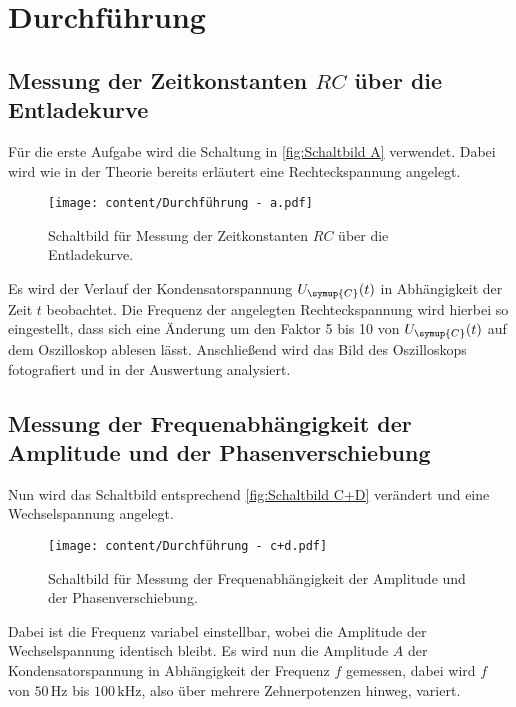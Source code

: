 \section{Durchführung}
\label{sec:Durchführung}

\subsection{Messung der Zeitkonstanten $RC$ über die Entladekurve}

Für die erste Aufgabe wird die Schaltung in \autoref{fig:Schaltbild A} verwendet.
Dabei wird wie in der Theorie bereits erläutert eine Rechteckspannung angelegt.

\begin{figure}
    \centering
    \texttt{[image: content/Durchführung - a.pdf]}
    \caption{Schaltbild für Messung der Zeitkonstanten $RC$ über die Entladekurve. \cite{v353}}
    \label{fig:Schaltbild A}
\end{figure}


Es wird der Verlauf der Kondensatorspannung $U_{\symup{C}}(t)$ in Abhängigkeit der Zeit $t$ beobachtet.
Die Frequenz der angelegten Rechteckspannung wird hierbei so eingestellt,
dass sich eine Änderung um den Faktor 5 bis 10 von $U_{\symup{C}}(t)$ auf dem Oszilloskop ablesen lässt.
Anschließend wird das Bild des Oszilloskops fotografiert und in der Auswertung analysiert.

\subsection{Messung der Frequenabhängigkeit der Amplitude und der Phasenverschiebung}

Nun wird das Schaltbild entsprechend  \autoref{fig:Schaltbild C+D} verändert und eine Wechselspannung angelegt.

\begin{figure} [H]
    \centering
    \texttt{[image: content/Durchführung - c+d.pdf]}
    \caption{Schaltbild für Messung der Frequenabhängigkeit der Amplitude und der Phasenverschiebung. \cite{v353}}
    \label{fig:Schaltbild C+D}
\end{figure}

Dabei ist die Frequenz variabel einstellbar, wobei die Amplitude der Wechselspannung identisch bleibt.
Es wird nun die Amplitude $A$ der Kondensatorspannung in Abhängigkeit der Frequenz $f$ gemessen,
dabei wird $f$ von $50\,\unit{\hertz}$ bis $100\,\unit{\kilo\hertz}$, also über mehrere Zehnerpotenzen hinweg, variert.

